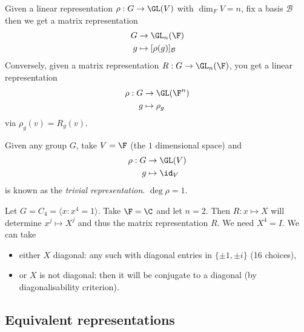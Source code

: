 \documentclass[a4paper]{article}
\theoremstyle{definition}
\begin{document}
Given a linear representation \(\rho: G \to \GL(V)\) with \(\dim_FV = n\), fix a basis \(\mathcal B\) then we get a matrix representation
\begin{align*}
  G &\to \GL_n(\F) \\
  g &\mapsto [\rho(g)]_{\mathcal B}
\end{align*}
Conversely, given a matrix representation \(R: G \to \GL_n(\F)\), you get a linear representation
\begin{align*}
  \rho: G &\to \GL(\F^n) \\
  g &\mapsto \rho_g
\end{align*}
via \(\rho_g(v) = R_g(v)\).

\begin{eg}
  Given any group \(G\), take \(V = \F\) (the \(1\) dimensional space) and
  \begin{align*}
    \rho: G &\to \GL(V) \\
    g &\mapsto \id_V
  \end{align*}
  is known as the \emph{trivial representation}. \(\deg \rho = 1\).
\end{eg}

\begin{eg}
  Let \(G = C_4 = \langle x: x^4 = 1 \rangle\). Take \(\F = \C\) and let \(n = 2\). Then \(R: x \mapsto X\) will determine \(x^j \mapsto X^j\) and thus the matrix representation \(R\). We need \(X^4 = I\). We can take
  \begin{itemize}
  \item either \(X\) diagonal: any such with diagonal entries in \(\{\pm 1, \pm i\}\) (16 choices),
  \item or \(X\) is not diagonal: then it will be conjugate to a diagonal (by diagonalisability criterion).
  \end{itemize}
\end{eg}

\subsection{Equivalent representations}
\end{document}
